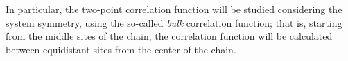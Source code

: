 In particular, the two-point correlation function will be studied considering the system symmetry, using the so-called \emph{bulk} correlation function; that is, starting from the middle sites of the chain, the correlation function will be calculated between equidistant sites from the center of the chain. 








